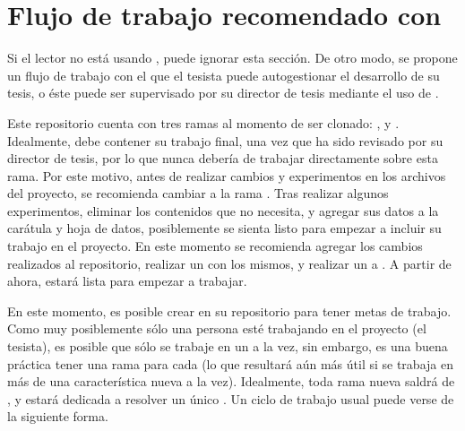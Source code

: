 \section[Uso recomendado con git]{Flujo de trabajo recomendado con }
\label{sec:git}

Si el lector no est\'a usando , puede ignorar esta
secci\'on.   De otro modo, se propone un flujo de trabajo con el que el tesista
puede autogestionar el desarrollo de su tesis, o \'este puede ser supervisado
por su director de tesis mediante el uso de .

Este repositorio cuenta con tres ramas al momento de ser clonado: ,
 y .   Idealmente,  debe contener su
trabajo final, una vez que ha sido revisado por su director de tesis, por lo que
nunca deber\'ia de trabajar directamente sobre esta rama.   Por este motivo,
antes de realizar cambios y experimentos en los archivos del proyecto, se
recomienda cambiar a la rama .   Tras realizar algunos experimentos,
eliminar los contenidos que no necesita, y agregar sus datos a la car\'atula y
hoja de datos, posiblemente se sienta listo para empezar a incluir su trabajo en
el proyecto.   En este momento se recomienda agregar los cambios realizados al
repositorio, realizar un  con los mismos, y realizar un 
a .   A partir de ahora,  estar\'a lista para empezar a
trabajar.

En este momento, es posible crear
\href{https://guides.github.com/features/issues/}{} en su
repositorio para tener metas de trabajo.   Como muy posiblemente s\'olo una
persona est\'e trabajando en el proyecto (el tesista), es posible que s\'olo
se trabaje en un  a la vez, sin embargo, es una buena pr\'actica
tener una rama para cada  (lo que resultar\'a a\'un m\'as \'util si
se trabaja en m\'as de una caracter\'istica nueva a la vez).   Idealmente, toda
rama nueva saldr\'a de , y estar\'a dedicada a resolver un \'unico
.   Un ciclo de trabajo usual puede verse
de la siguiente forma.


